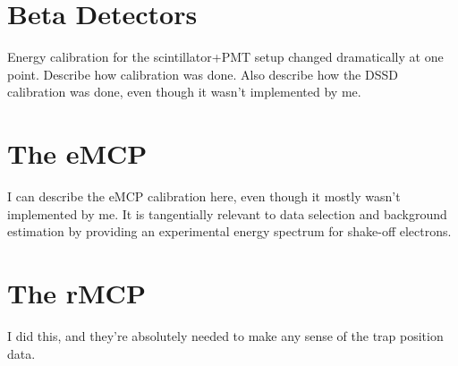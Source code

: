 \section{Beta Detectors}
	Energy calibration for the scintillator+PMT setup changed dramatically at one point.    Describe how calibration was done.  Also describe how the DSSD calibration was done, even though it wasn't implemented by me.    
\section{The eMCP}
	I can describe the eMCP calibration here, even though it mostly wasn't implemented by me.  It is tangentially relevant to data selection and background estimation by providing an experimental energy spectrum for shake-off electrons.  

\section{The rMCP}
	I did this, and they're absolutely needed to make any sense of the trap position data.  













